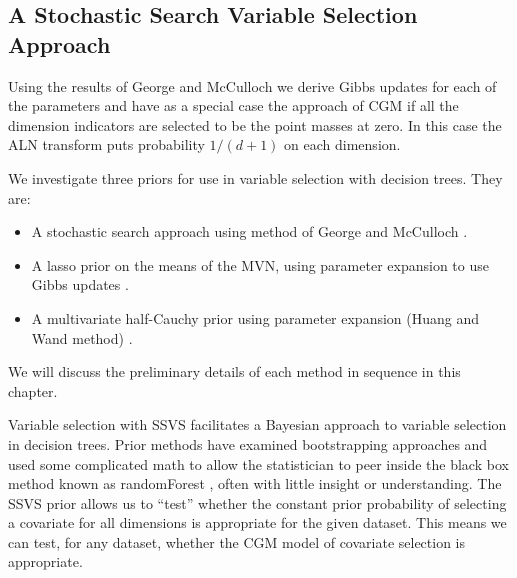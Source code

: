 
\subsection{A Stochastic Search Variable Selection Approach}

Using the results of George and McCulloch we derive Gibbs updates for each of the parameters and have as a special case the approach of CGM if all the dimension indicators are selected to be the point masses at zero. In this case the ALN transform puts probability $1/(d+1)$ on each dimension. 


We investigate three priors for use in variable selection with decision trees. They are: 

\begin{itemize}
\item A stochastic search approach using method of George and McCulloch \cite{cui2008empirical,george1993variable}. 
\item A lasso prior on the means of the MVN,  using parameter expansion to use Gibbs updates \cite{park2008bayesian}. 
\item A multivariate half-Cauchy prior using parameter expansion (Huang and Wand method) \cite{huang2013simple,polson2011half,carvalho2010horseshoe,carvalhohandling}. 
\end{itemize}

We will discuss the preliminary details of each method in sequence in this chapter. 

Variable selection with SSVS facilitates a Bayesian approach to variable selection in decision trees. Prior methods have examined bootstrapping approaches and used some complicated math to allow the statistician to peer inside the black box method known as randomForest \cite{ishwaran2010high, ishwaran2007variable}, often with little insight or understanding. The SSVS prior allows us to ``test'' whether the constant prior probability of selecting a covariate for all dimensions is appropriate for the given dataset. This means we can test, for any dataset, whether the CGM model of covariate selection is appropriate.


